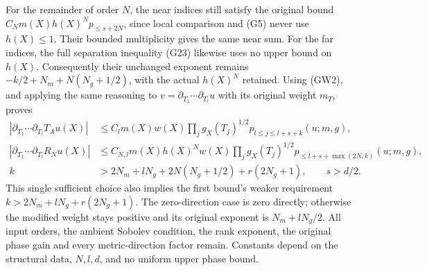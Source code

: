 \documentclass[
  11pt,
]{article}
\begin{document}
For the remainder of order \(N\), the near indices still satisfy the
original bound \(C_Nm(X)h(X)^Np_{\leq s+2N}\), since local comparison
and (G5) never use \(h(X)\leq1\). Their bounded multiplicity gives the
same near sum. For the far indices, the full separation inequality (G23)
likewise uses no upper bound on \(h(X)\). Consequently their unchanged
exponent remains \(-k/2+N_m+N(N_g+1/2)\), with the actual \(h(X)^N\)
retained. Using (GW2), and applying the same reasoning to
\(v=\partial_{T_1}\cdots\partial_{T_l}u\) with its original weight
\(m_T\), proves \[
 \begin{aligned}
 |\partial_{T_1}\cdots\partial_{T_l}T_Au(X)|
 &\leq C_lm(X)w(X)\prod_jg_X(T_j)^{1/2}
          p_{l\leq j\leq l+s+k}(u;m,g),\\
 |\partial_{T_1}\cdots\partial_{T_l}R_Nu(X)|
 &\leq C_{N,l}m(X)h(X)^Nw(X)\prod_jg_X(T_j)^{1/2}
          p_{\leq l+s+\max(2N,k)}(u;m,g),\\
 k&>2N_m+lN_g+2N(N_g+1/2)+r(2N_g+1),\qquad s>d/2.
 \end{aligned}
 \tag{GW4}
\] This single sufficient choice also implies the first bound's weaker
requirement \(k>2N_m+lN_g+r(2N_g+1)\). The zero-direction case is zero
directly; otherwise the modified weight stays positive and its original
exponent is \(N_m+lN_g/2\). All input orders, the ambient Sobolev
condition, the rank exponent, the original phase gain and every
metric-direction factor remain. Constants depend on the structural data,
\(N,l,d\), and no uniform upper phase bound.
\end{document}
